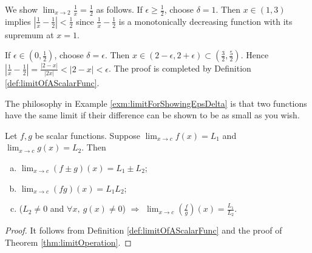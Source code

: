 \begin{exm}
  \label{exm:limitForShowingEpsDelta}
   We show $\lim_{x\rightarrow 2}\frac{1}{x}= \frac{1}{2}$ as follows.
   If $\epsilon\ge \frac{1}{2}$,
   choose $\delta=1$.
   Then $x\in(1,3)$ implies
   $\left|\frac{1}{x}-\frac{1}{2}\right|<\frac{1}{2}$
   since $\frac{1}{x}-\frac{1}{2}$
   is a monotonically decreasing function
   with its supremum at $x=1$.

  If $\epsilon\in (0,\frac{1}{2})$,
   choose $\delta=\epsilon$.
  Then $x\in (2-\epsilon,2+\epsilon)\subset
  (\frac{3}{2},\frac{5}{2})$.
  Hence
  $\left|\frac{1}{x}-\frac{1}{2}\right|=\frac{|2-x|}{|2x|}<|2-x|<\epsilon$.
  The proof is completed by Definition \ref{def:limitOfAScalarFunc}.
\end{exm}

\begin{rem}
  The philosophy in Example \ref{exm:limitForShowingEpsDelta}
  is that two functions have the same limit
  if their difference can be shown to be as small as you wish.
\end{rem}

\begin{thm}
  \label{thm:funcLimitOperation}
  Let $f,g$ be scalar functions.
  Suppose $\lim_{x\rightarrow c}f(x)=L_{1}$ and
  $\lim_{x\rightarrow c}g(x)=L_{2}$. Then
  \begin{enumerate}[(a)]
  \item $\lim_{x\rightarrow c}(f\pm g)(x)=L_{1}\pm L_{2}$;
  \item $\lim_{x\rightarrow c}(fg)(x)=L_{1}L_{2}$;
  \item ($L_{2}\neq 0$ and $\forall x,\ g(x)\neq 0$)
    $\Rightarrow$
    $\lim_{x\rightarrow c}(\frac{f}{g})(x)=\frac{L_{1}}{L_{2}}$.
  \end{enumerate}
\end{thm}
\begin{proof}
  It follows from Definition \ref{def:limitOfAScalarFunc}
  and the proof of Theorem \ref{thm:limitOperation}.
\end{proof}

